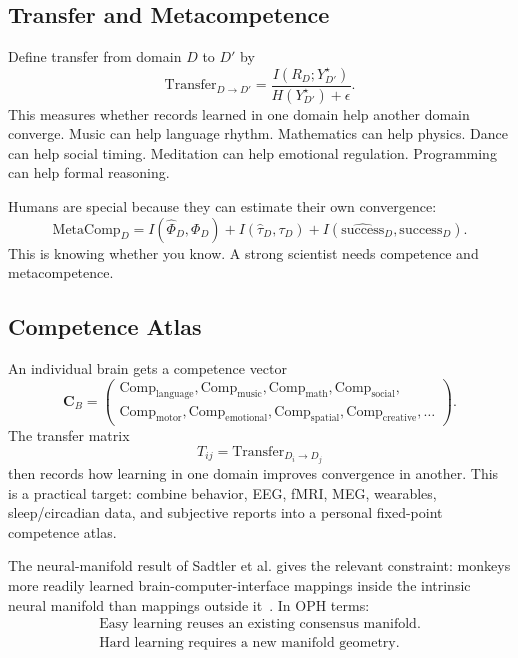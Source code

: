 \documentclass[11pt]{article}
\theoremstyle{remark}
\theoremstyle{plain}
\begin{document}
\subsection{Transfer and Metacompetence}

Define transfer from domain \(D\) to \(D'\) by
\[
\boxed{
\mathrm{Transfer}_{D\to D'}
=
\frac{
I(R_D;Y_{D'}^\star)
}{
H(Y_{D'}^\star)+\epsilon
}.
}
\]
This measures whether records learned in one domain help another domain converge. Music can help language rhythm. Mathematics can help physics. Dance can help social timing. Meditation can help emotional regulation. Programming can help formal reasoning.

Humans are special because they can estimate their own convergence:
\[
\boxed{
\mathrm{MetaComp}_D
=
I(\widehat{\Phi}_D,\Phi_D)
+
I(\widehat{\tau}_D,\tau_D)
+
I(\widehat{\mathrm{success}}_D,\mathrm{success}_D).
}
\]
This is knowing whether you know. A strong scientist needs competence and metacompetence.

\subsection{Competence Atlas}

An individual brain gets a competence vector
\[
\boxed{
\mathbf C_B
=
\left(
\begin{gathered}
\mathrm{Comp}_{\mathrm{language}},
\mathrm{Comp}_{\mathrm{music}},
\mathrm{Comp}_{\mathrm{math}},
\mathrm{Comp}_{\mathrm{social}},\\
\mathrm{Comp}_{\mathrm{motor}},
\mathrm{Comp}_{\mathrm{emotional}},
\mathrm{Comp}_{\mathrm{spatial}},
\mathrm{Comp}_{\mathrm{creative}},
\ldots
\end{gathered}
\right).
}
\]
The transfer matrix
\[
\boxed{
T_{ij}=\mathrm{Transfer}_{D_i\to D_j}
}
\]
then records how learning in one domain improves convergence in another. This is a practical target: combine behavior, EEG, fMRI, MEG, wearables, sleep/circadian data, and subjective reports into a personal fixed-point competence atlas.

The neural-manifold result of Sadtler et al. gives the relevant constraint: monkeys more readily learned brain-computer-interface mappings inside the intrinsic neural manifold than mappings outside it~\cite{Sadtler2014}. In OPH terms:
\[
\boxed{
\begin{gathered}
\text{Easy learning reuses an existing consensus manifold.}\\
\text{Hard learning requires a new manifold geometry.}
\end{gathered}
}
\]
\end{document}
